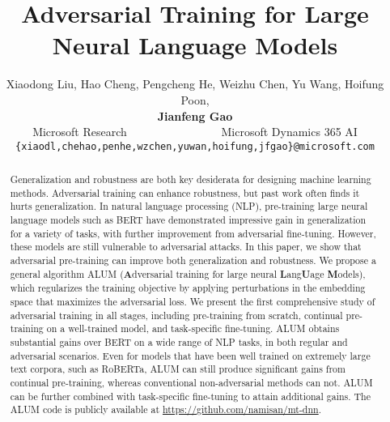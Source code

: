 \documentclass[11pt,a4paper]{article}
\title{Adversarial Training for Large Neural Language Models}
\author{
Xiaodong Liu, Hao Cheng, Pengcheng He, Weizhu Chen, Yu Wang, Hoifung Poon, \\ \textbf{Jianfeng Gao}
 \\ 
   Microsoft Research~~~~~~~~~~~~~~~~
   Microsoft Dynamics 365 AI 
 \\
  {\tt \{xiaodl,chehao,penhe,wzchen,yuwan,hoifung,jfgao\}@microsoft.com}
}
\date{}
\newcommand\DNAME{ALUM}
\begin{document}
\maketitle


\begin{abstract}

Generalization and robustness are both key desiderata for designing machine learning methods.
Adversarial training can enhance robustness, but past work often finds it hurts generalization.
In natural language processing (NLP), pre-training large neural language models such as BERT have demonstrated impressive gain in generalization for a variety of tasks, with further improvement from adversarial fine-tuning.
However, these models are still vulnerable to adversarial attacks.
In this paper, we show that adversarial pre-training can improve both generalization and robustness.
We propose a general algorithm {\DNAME} (\textbf{A}dversarial training for large neural \textbf{L}ang\textbf{U}age \textbf{M}odels), which regularizes the training objective by applying perturbations in the embedding space that maximizes the adversarial loss. 
We present the first comprehensive study of adversarial training in all stages, including pre-training from scratch, continual pre-training on a well-trained model, and task-specific fine-tuning. 
{\DNAME} obtains substantial gains over BERT on a wide range of NLP tasks, in both regular and adversarial scenarios. 
Even for models that have been well trained on extremely large text corpora, such as RoBERTa, {\DNAME} can still produce significant gains from continual pre-training, whereas conventional non-adversarial methods can not.
{\DNAME} can be further combined with task-specific fine-tuning to attain additional gains.
The {\DNAME} code is publicly available at \hyperlink{https://github.com/namisan/mt-dnn}{https://github.com/namisan/mt-dnn}.


\end{abstract}
\end{document}
